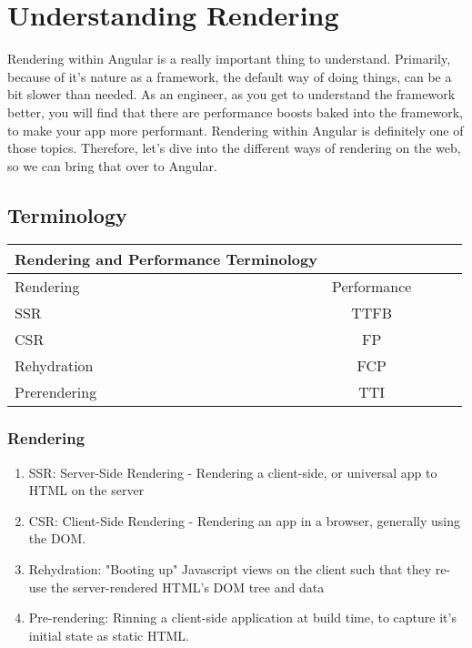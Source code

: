 \chapter{Understanding Rendering}

Rendering within Angular is a really important thing to understand. Primarily, because of it's nature as a framework, the default way of doing things, can be a bit slower than needed. As an engineer, as you get to understand the framework better, you will find that there are performance boosts baked into the framework, to make your app more performant. Rendering within Angular is definitely one of those topics. Therefore, let's dive into the different ways of rendering on the web, so we can bring that over to Angular. 

\section{Terminology}

\begin{center}
  \begin{tabular}{@{} l *4c @{}}
    \toprule
    {{\color{red}Rendering} and {\color{blue}Performance} Terminology}\\
    \toprule
    {\color{red}Rendering} & {\color{blue}Performance} \\
    \midrule
    SSR           & TTFB \\
    CSR           & FP \\
    Rehydration   & FCP \\
    Prerendering  & TTI \\
  \end{tabular}
\end{center}  

\subsection{Rendering}
\begin{enumerate}
  \item SSR: Server-Side Rendering - Rendering a client-side, or universal app to HTML on the server
  \item CSR: Client-Side Rendering - Rendering an app in a browser, generally using the DOM.
  \item Rehydration: "Booting up" Javascript views on the client such that they re-use the server-rendered HTML's DOM tree and data
  \item Pre-rendering: Rinning a client-side application at build time, to capture it's initial state as static HTML.
\end{enumerate}

